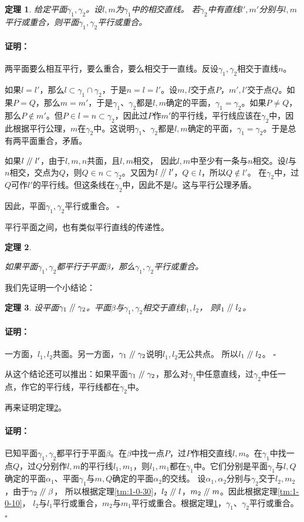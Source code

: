 \documentclass[12pt,UTF8]{ctexbook}
\newtheorem{tm}{定理}[section]
\renewenvironment{proof}{\paragraph{\textbf{证明：}}}{\hfill$\square$}
\renewcommand\parallel{\mathrel{/\mskip-4mu/}}
\begin{document}
\begin{tm}\label{tm:1-0-70}
    给定平面$\gamma_1, \gamma_2$。设$l,m$为$\gamma_1$中的相交直线。
    若$\gamma_2$中有直线$l',m'$分别与$l,m$平行或重合，则平面$\gamma_1, \gamma_2$平行或重合。
\end{tm}
\begin{proof}
    两平面要么相互平行，要么重合，要么相交于一直线。反设$\gamma_1, \gamma_2$相交于直线$n$。

    如果$l=l'$，那么$l\subset \gamma_1\cap\gamma_2$，于是$n=l=l'$。设$m,l$交于点$P$，$m',l'$交于点$Q$。如果$P=Q$，那么$m=m'$，于是$\gamma_1$、$\gamma_2$都是$l,m$确定的平面，$\gamma_1=\gamma_2$。如果$P\neq Q$，那么$P\notin m'$。但$P\in l=n\subset\gamma_2$，因此过$P$作$m'$的平行线，平行线应该在$\gamma_2$中，因此根据平行公理，$m$在$\gamma_2$中。这说明$\gamma_1$、$\gamma_2$都是$l,m$确定的平面，$\gamma_1=\gamma_2$。于是总有两平面重合，矛盾。

    如果$l\parallel l'$，由于$l,m,n$共面，且$l,m$相交，
    因此$l,m$中至少有一条与$n$相交。设$l$与$n$相交，交点为$Q$，则$Q\in n\subset\gamma_2$。又因为$l\parallel l'$，$Q\in l$，所以$Q\notin l'$。
    在$\gamma_2$中，过$Q$可作$l'$的平行线。但这条线在$\gamma_2$中，因此不是$l$。这与平行公理矛盾。

    因此，平面$\gamma_1, \gamma_2$平行或重合。
\end{proof}

平行平面之间，也有类似平行直线的传递性。
\begin{tm}\label{tm:1-0-80}

如果平面$\gamma_1,\gamma_2$都平行于平面$\beta$，那么$\gamma_1,\gamma_2$平行或重合。
\end{tm}
我们先证明一个小结论：
\begin{tm}\label{tm:1-0-90}
    设平面$\gamma_1\parallel \gamma_2$。平面$\beta$与$\gamma_1,\gamma_2$相交于直线$l_1,l_2$，
    则$l_1\parallel l_2$。
\end{tm}
\begin{proof}
    一方面，$l_1,l_2$共面。另一方面，$\gamma_1\parallel \gamma_2$说明$l_1,l_2$无公共点。
    所以$l_1\parallel l_2$。
\end{proof}

从这个结论还可以推出：如果平面$\gamma_1\parallel \gamma_2$，那么对$\gamma_1$中任意直线，过$\gamma_2$中任一点，作它的平行线，平行线都在$\gamma_2$中。

再来证明定理\ref{tm:1-0-80}。
\begin{proof}
    已知平面$\gamma_1,\gamma_2$都平行于平面$\beta$。在$\beta$中找一点$P$，过$P$作相交直线$l,m$。在$\gamma_1$中找一点$Q$，过$Q$分别作$l,m$的平行线$l_1,m_1$，则$l_1,m_1$都在$\gamma_1$中。它们分别是平面$\gamma_1$与$l,Q$确定的平面$\alpha_1$、平面$\gamma_1$与$m,Q$确定的平面$\alpha_2$的交线。
    设$\alpha_1,\alpha_2$分别与$\gamma_2$交于$l_2,m_2$，由于$\gamma_2\parallel \beta$，
    所以根据定理\ref{tm:1-0-30}，$l_2\parallel l$，$m_2\parallel m$。因此根据定理\ref{tm:1-0-10}，
    $l_2$与$l_1$平行或重合，$m_2$与$m_1$平行或重合。根据定理\ref{tm:1-0-70}，$\gamma_1$、$\gamma_2$平行或重合。
\end{proof}
\end{document}
